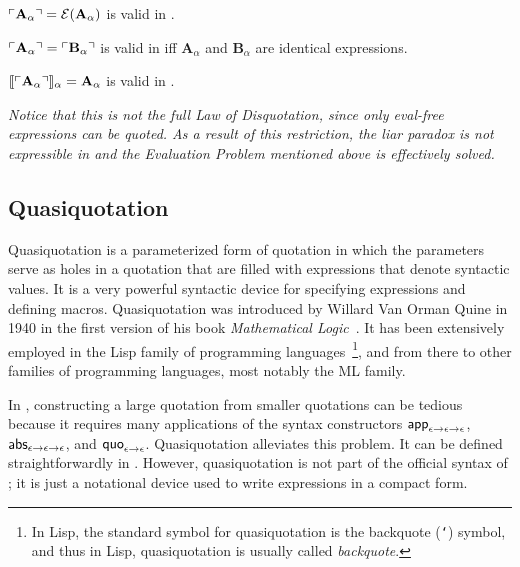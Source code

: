 \documentclass[fleqn]{llncs}
\begin{document}
\begin{thm} \label{thm:sem-quotation}
$\ulcorner\textbf{A}_\alpha\urcorner = \mbox{$\cal E$}(\textbf{A}_\alpha)$ is valid in
  {\churchqe}.
\end{thm}

\begin{cor}$\ulcorner\textbf{A}_\alpha\urcorner = \ulcorner\textbf{B}_\alpha\urcorner$ is valid in
  {\churchqe} iff $\textbf{A}_\alpha$ and $\textbf{B}_\alpha$ are
  identical expressions.
\end{cor}

\begin{thm} \label{thm:sem-disquotation}
$\llbracket\ulcorner\textbf{A}_\alpha\urcorner\rrbracket_\alpha = \textbf{A}_\alpha$
  is valid in {\churchqe}.
\end{thm}

\begin{rem}\em
Notice that this is not the full Law of Disquotation, since only
eval-free expressions can be quoted.  As a result of this restriction,
the liar paradox is not expressible in {\churchqe} and the Evaluation
Problem mentioned above is effectively solved.
\end{rem}

\subsection{Quasiquotation}

Quasiquotation is a parameterized form of quotation in which the
parameters serve as holes in a quotation that are filled with
expressions that denote syntactic values.  It is a very powerful
syntactic device for specifying expressions and defining macros.
Quasiquotation was introduced by Willard Van Orman Quine in 1940 in
the first version of his book \emph{Mathematical
  Logic}~\cite{Quine03}.  It has been extensively employed in the Lisp
family of programming languages~\cite{Bawden99}\footnote{In Lisp, the
  standard symbol for quasiquotation is the backquote ({\tt `})
  symbol, and thus in Lisp, quasiquotation is usually called
  \emph{backquote}.}, and from there to other families of
programming languages, most notably the ML family.

In {\churchqe}, constructing a large quotation from smaller quotations
can be tedious because it requires many applications of the syntax
constructors $\mbox{\sf app}_{\epsilon \rightarrow \epsilon \rightarrow
  \epsilon}$, $\mbox{\sf abs}_{\epsilon \rightarrow \epsilon \rightarrow
  \epsilon}$, and $\mbox{\sf quo}_{\epsilon \rightarrow \epsilon}$.
Quasiquotation alleviates this problem.
It can be defined straightforwardly in
{\churchqe}.  However, quasiquotation is not part of the official
syntax of {\churchqe}; it is just a notational device used to write
{\churchqe} expressions in a compact form.
\end{document}
